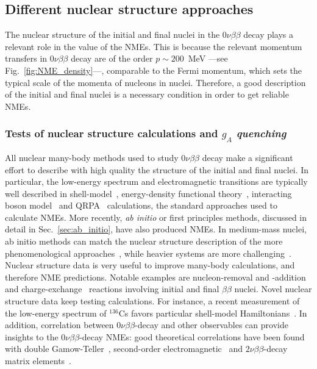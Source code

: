 \subsection{Different nuclear structure approaches}
\label{subsec:manybody}

The nuclear structure of the initial and final nuclei in the $0\nu\beta\beta$ decay plays a relevant role in the value of the NMEs. This is because the relevant momentum transfers in $0\nu\beta\beta$ decay are of the order $p\sim200$~MeV  ---see Fig.~\ref{fig:NME_density}---, comparable to the Fermi momentum, which sets the typical scale of the momenta of nucleons in nuclei. Therefore, a good description of the initial and final nuclei is a necessary condition in order to get reliable NMEs.

\subsubsection{Tests of nuclear structure calculations and {\it $g_A$ quenching}}

All nuclear many-body methods used to study $0\nu\beta\beta$ decay make a significant effort to describe with high quality the structure of the initial and final nuclei. In particular, the low-energy spectrum and electromagnetic transitions are typically well described in shell-model~\cite{Menendez:2009xa,Horoi:2015tkc,Iwata:2016cxn,Coraggio:2020hwx,Coraggio:2022vgy,Tsunoda:2023fqw}, energy-density functional theory~\cite{Yao:2021wst}, interacting boson model~\cite{Kotila:2016pib} and QRPA~\cite{Gimeno:2023dxx} calculations, the standard approaches used to calculate NMEs. More recently, {\it ab initio} or first principles methods, discussed in detail in Sec.~\ref{sec:ab_initio}, have also produced NMEs. In medium-mass nuclei, ab initio methods can match the nuclear structure description of the more phenomenological approaches~\cite{Yao:2020olm,Novario:2020dmr,Belley:2020ejd}, while heavier systems are more challenging~\cite{Belley:2020ejd}.
%
Nuclear structure data is very useful to improve many-body calculations, and therefore NME predictions. Notable examples are nucleon-removal and -addition~\cite{Freeman:2012hr,Freeman:2017bak,Szwec:2016fxr} and charge-exchange~\cite{Frekers:2018edj} reactions involving initial and final $\beta\beta$ nuclei. Novel nuclear structure data keep testing calculations. For instance, a recent measurement of the low-energy spectrum of $^{136}$Cs favors particular shell-model Hamiltonians~\cite{Rebeiro:2023kvs}. In addition, correlation between $0\nu\beta\beta$-decay and other observables can provide insights to the $0\nu\beta\beta$-decay NMEs: good theoretical correlations have been found with double Gamow-Teller~\cite{Shimizu:2017qcy,Yao:2022usd,Jokiniemi:2023bes}, second-order electromagnetic~\cite{Romeo:2021zrn,Jokiniemi:2023bes} and $2\nu\beta\beta$-decay matrix elements~\cite{Jokiniemi:2022ayc}.

